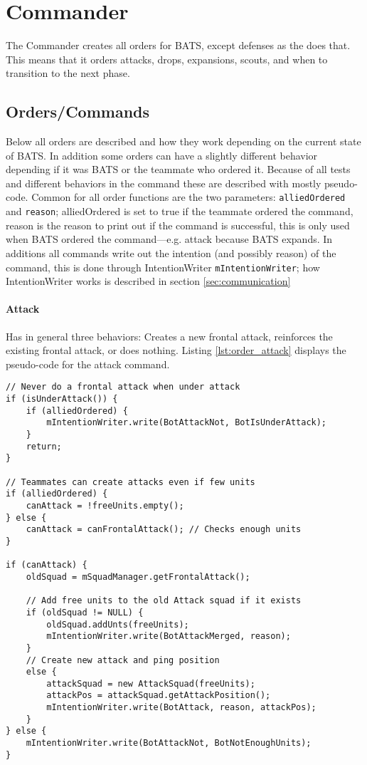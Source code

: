 \section{Commander}
\label{sec:Commander}
The Commander creates all orders for BATS, except defenses as the  does that. This means that it orders attacks, drops, expansions, scouts, and when to transition to the next phase.

\subsection{Orders/Commands}
Below all orders are described and how they work depending on the current state of BATS. In addition some orders can have a slightly different behavior depending if it was BATS or the teammate who ordered it. Because of all tests and different behaviors in the command these are described with mostly pseudo-code. Common for all order functions are the two parameters: \texttt{alliedOrdered} and \texttt{reason}; alliedOrdered is set to true if the teammate ordered the command, reason is the reason to print out if the command is successful, this is only used when BATS ordered the command—e.g. attack because BATS expands. In additions all commands write out the intention (and possibly reason) of the command, this is done through IntentionWriter \texttt{mIntentionWriter}; how IntentionWriter works is described in section \ref{sec:communication}

\paragraph{Attack}
Has in general three behaviors: Creates a new frontal attack, reinforces the existing frontal attack, or does nothing. Listing \ref{lst:order_attack} displays the pseudo-code for the attack command.
\begin{lstlisting}[label={lst:order_attack},caption={Pseudo-code for the attack command}]
// Never do a frontal attack when under attack
if (isUnderAttack()) {
	if (alliedOrdered) {
		mIntentionWriter.write(BotAttackNot, BotIsUnderAttack);
	}
	return;
}

// Teammates can create attacks even if few units
if (alliedOrdered) {
	canAttack = !freeUnits.empty();
} else {
	canAttack = canFrontalAttack(); // Checks enough units
}

if (canAttack) {
	oldSquad = mSquadManager.getFrontalAttack();
	
	// Add free units to the old Attack squad if it exists
	if (oldSquad != NULL) {
		oldSquad.addUnts(freeUnits);
		mIntentionWriter.write(BotAttackMerged, reason);
	}
	// Create new attack and ping position
	else {
		attackSquad = new AttackSquad(freeUnits);
		attackPos = attackSquad.getAttackPosition();
		mIntentionWriter.write(BotAttack, reason, attackPos);
	}
} else {
	mIntentionWriter.write(BotAttackNot, BotNotEnoughUnits);
}
\end{lstlisting}

